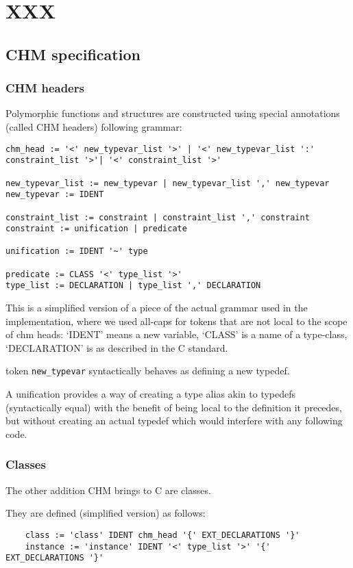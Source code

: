\chapter{XXX}

\section{CHM specification}

\subsection{CHM headers}

Polymorphic functions and structures are constructed using special annotations (called CHM headers) following grammar:

\begin{lstlisting}
chm_head := '<' new_typevar_list '>' | '<' new_typevar_list ':' constraint_list '>'| '<' constraint_list '>'

new_typevar_list := new_typevar | new_typevar_list ',' new_typevar
new_typevar := IDENT

constraint_list := constraint | constraint_list ',' constraint
constraint := unification | predicate

unification := IDENT '~' type

predicate := CLASS '<' type_list '>'
type_list := DECLARATION | type_list ',' DECLARATION
\end{lstlisting}

This is a simplified version of a piece of the actual grammar used in the implementation,
where we used all-caps for tokens that are not local to the scope of chm heads: `IDENT' means a new variable,
`CLASS' is a name of a type-class, %
`DECLARATION' is as described in the C standard.

token \lstinline{new_typevar} syntactically behaves as defining a new typedef.

A unification provides a way of creating a type alias akin to typedefs (syntactically equal) with the benefit of being local to the definition
it precedes, but without creating an actual typedef which would interfere with any following code.

\subsection{Classes}

The other addition CHM brings to C are classes.

They are defined (simplified version) as follows:

\begin{lstlisting}
    class := 'class' IDENT chm_head '{' EXT_DECLARATIONS '}'
    instance := 'instance' IDENT '<' type_list '>' '{' EXT_DECLARATIONS '}'
\end{lstlisting}
